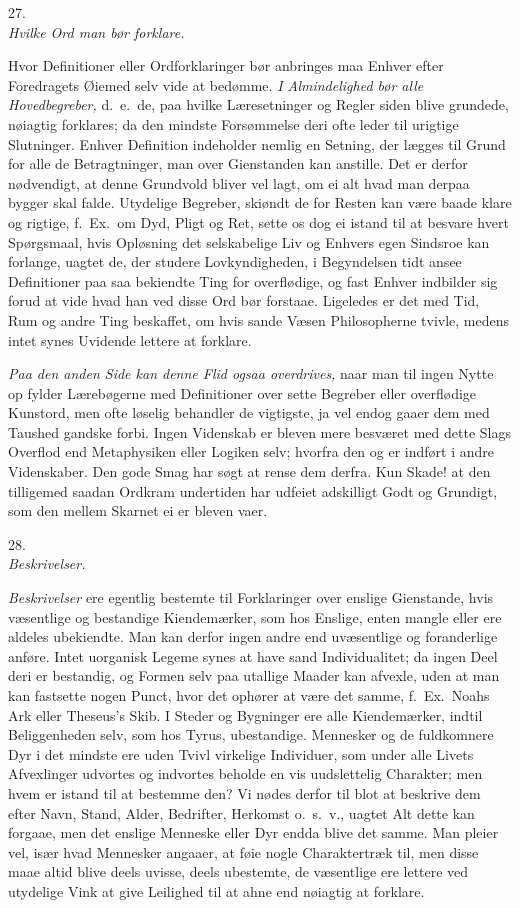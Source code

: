\documentclass[12pt,a4paper]{article}
\newcommand{\logsec}[2]{%
  \bigskip\begin{center}{\large #1}\\[4pt]{\emph{#2}}\end{center}\smallskip}
\newcommand{\opage}[1]{\marginnote{\footnotesize\textit{[#1]}}}
\begin{document}
\opage{93} \logsec{27.}{Hvilke Ord man bør forklare.}

\noindent
Hvor Definitioner eller Ordforklaringer bør anbringes maa Enhver efter
Foredragets Øiemed selv vide at bedømme. \emph{I Almindelighed bør alle
Hovedbegreber,} d.~e.\ de, paa hvilke Læresetninger og Regler siden blive
grundede, nøiagtig forklares; da den mindste Forsømmelse deri ofte leder til
urigtige Slutninger. Enhver Definition indeholder nemlig en Setning, der lægges
til Grund for alle de Betragtninger, man over Gienstanden kan anstille. Det er
derfor nødvendigt, at denne Grundvold bliver vel lagt, om ei alt hvad man
derpaa bygger skal falde. Utydelige Begreber, skiøndt de for Resten kan være
baade klare og rigtige, f.~Ex.\ om Dyd, Pligt og Ret, sette os dog ei istand til
at besvare hvert Spørgsmaal, hvis Opløsning det selskabelige Liv og Enhvers
egen Sindsroe kan forlange, uagtet de, der studere Lovkyndigheden, i
Begyndelsen tidt ansee Definitioner paa saa bekiendte Ting for overflødige, og
fast Enhver indbilder sig forud at vide hvad han ved disse Ord bør forstaae.
Ligeledes er det med Tid, Rum og andre Ting beskaffet, om hvis sande Væsen
Philosopherne tvivle, medens intet synes Uvidende lettere at forklare.

\emph{Paa den anden Side kan denne Flid ogsaa overdrives,} naar man til ingen
Nytte op%
\opage{94}fylder Lærebøgerne med Definitioner over sette Begreber eller overflødige
Kunstord, men ofte løselig behandler de vigtigste, ja vel endog gaaer dem med
Taushed gandske forbi. Ingen Videnskab er bleven mere besværet med dette Slags
Overflod end Metaphysiken eller Logiken selv; hvorfra den og er indført i andre
Videnskaber. Den gode Smag har søgt at rense dem derfra. Kun Skade! at den
tilligemed saadan Ordkram undertiden har udfeiet adskilligt Godt og Grundigt,
som den mellem Skarnet ei er bleven vaer.

\logsec{28.}{Beskrivelser.}

\noindent
\emph{Beskrivelser} ere egentlig bestemte til Forklaringer over enslige
Gienstande, hvis væsentlige og bestandige Kiendemærker, som hos Enslige, enten
mangle eller ere aldeles ubekiendte. Man kan derfor ingen andre end uvæsentlige
og foranderlige anføre. Intet uorganisk Legeme synes at have sand
Individualitet; da ingen Deel deri er bestandig, og Formen selv paa utallige
Maader kan afvexle, uden at man kan fastsette nogen Punct, hvor det ophører at
være det samme, f.~Ex.\ Noahs Ark eller Theseus's Skib. I Steder og Bygninger
ere alle Kiendemærker, indtil Beliggenheden selv, som hos Tyrus, ubestandige.
Mennesker og de fuldkomnere Dyr i det mindste ere uden Tvivl virkelige
Individuer, som under alle Livets Afvexlinger udvortes og
\opage{95} indvortes beholde en vis uudslettelig Charakter; men hvem er istand til at
bestemme den? Vi nødes derfor til blot at beskrive dem efter Navn, Stand,
Alder, Bedrifter, Herkomst o.~s.~v., uagtet Alt dette kan forgaae, men det
enslige Menneske eller Dyr endda blive det samme. Man pleier vel, især hvad
Mennesker angaaer, at føie nogle Charaktertræk til, men disse maae altid blive
deels uvisse, deels ubestemte, de væsentlige ere lettere ved utydelige Vink at
give Leilighed til at ahne end nøiagtig at forklare.
\end{document}
